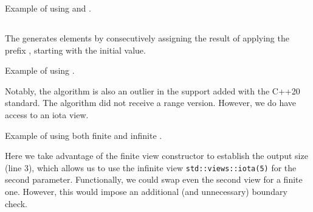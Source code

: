 \begin{box-note}
\footnotesize Example of using  and .
\tcblower
{}
\end{box-note}

\subsection{\texorpdfstring{}{\texttt{std::iota}}}

The  generates elements by consecutively assigning the result of applying the prefix , starting with the initial value.


\begin{box-note}
\footnotesize Example of using .
\tcblower
{}
\end{box-note}

Notably, the  algorithm is also an outlier in the support added with the C++20 standard. The  algorithm did not receive a range version. However, we do have access to an iota view.

\begin{box-nobreak}
\footnotesize Example of using both finite and infinite .
\tcblower
{}
\end{box-nobreak}

Here we take advantage of the finite view constructor  to establish the output size (line 3), which allows us to use the infinite view \texttt{std::views\-::iota(5)} for the second parameter. Functionally, we could swap even the second view for a finite one. However, this would impose an additional (and unnecessary) boundary check.
